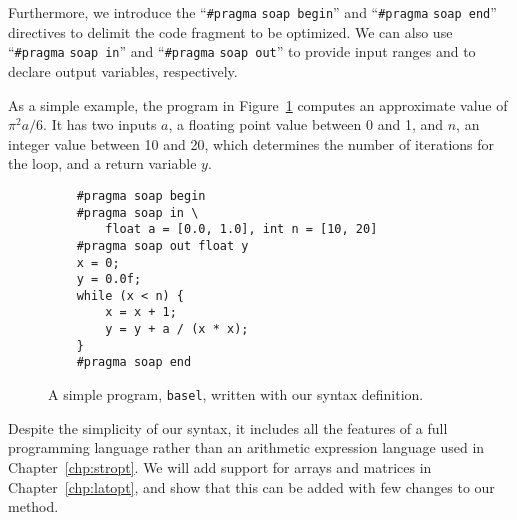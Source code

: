 Furthermore, we introduce the ``\verb|#pragma| \verb|soap begin|'' and
``\verb|#pragma| \verb|soap end|'' directives to delimit the code fragment
to be optimized.  We can also use ``\verb|#pragma| \verb|soap in|'' and
``\verb|#pragma| \verb|soap out|'' to provide input ranges and to declare
output variables, respectively.

As a simple example, the program in Figure~\ref{po:lst:syntax_example} computes
an approximate value of ${\pi^2 a}/6$.  It has two inputs $a$, a floating point
value between 0 and 1, and $n$, an integer value between 10 and 20, which
determines the number of iterations for the loop, and a return variable $y$.

\begin{figure}[ht]
    \centering
    \begin{minipage}{0.8\textwidth}
    \begin{lstlisting}
    #pragma soap begin
    #pragma soap in \
        float a = [0.0, 1.0], int n = [10, 20]
    #pragma soap out float y
    x = 0;
    y = 0.0f;
    while (x < n) {
        x = x + 1;
        y = y + a / (x * x);
    }
    #pragma soap end
    \end{lstlisting}
    \end{minipage}
    \caption{%
        A simple program, \texttt{basel}, written with our syntax definition.
    }\label{po:lst:syntax_example}
\end{figure}

Despite the simplicity of our syntax, it includes all the features of a full
programming language rather than an arithmetic expression language used in
Chapter~\ref{chp:stropt}.  We will add support for arrays and matrices in
Chapter~\ref{chp:latopt}, and show that this can be added with few changes to
our method.
